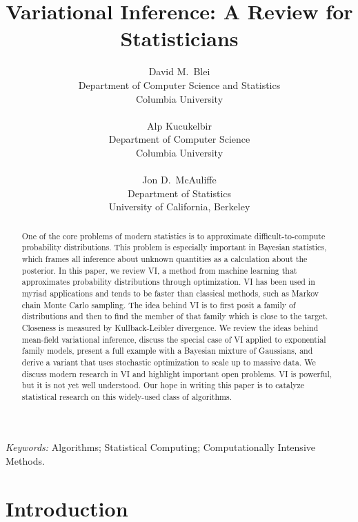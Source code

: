 \documentclass{article}
\begin{document}
\title{\textbf{Variational Inference: A Review for Statisticians}}
\author{David M.~Blei\\
  Department of Computer Science and Statistics\\ Columbia
  University\\ \\
  Alp Kucukelbir\\
  Department of Computer Science \\ Columbia University\\ \\
  Jon D.~McAuliffe \\
  Department of Statistics\\University of California, Berkeley}
\maketitle

\bigskip

\begin{abstract}
One of the core problems of modern statistics is to approximate
difficult-to-compute probability distributions. This problem is especially
important in Bayesian statistics, which frames all inference about unknown
quantities as a calculation about the posterior. In this paper, we review
\gls{VI}, a method from machine learning that approximates
probability distributions through optimization. \gls{VI} has been used in myriad
applications and tends to be faster than classical methods, such as Markov chain
Monte Carlo sampling. The idea behind \gls{VI} is to first posit a family of
distributions and then to find the member of that family which is close to the
target. Closeness is measured by Kullback-Leibler divergence. We review the
ideas behind mean-field variational inference, discuss the special case of
\gls{VI} applied to exponential family models, present a full example with a
Bayesian mixture of Gaussians, and derive a variant that uses stochastic
optimization to scale up to massive data.  We discuss modern research in
\gls{VI} and highlight important open problems. \gls{VI} is
powerful, but it is not yet well understood.  Our hope in writing this paper is
to catalyze statistical research on this widely-used class of algorithms.
\end{abstract}

\emph{Keywords:} Algorithms; 
Statistical Computing; Computationally Intensive Methods.

\clearpage
\glsresetall{}

\section{Introduction}
\end{document}
